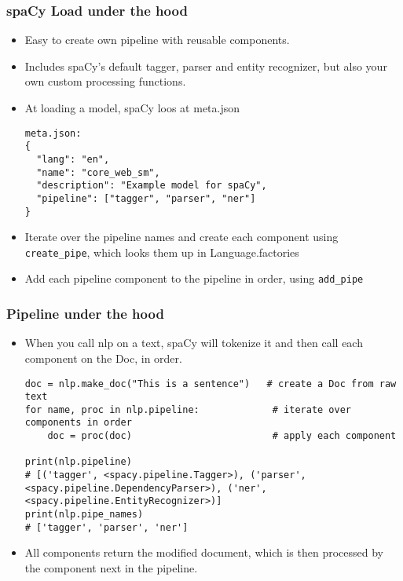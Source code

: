 \begin{frame}[fragile]\frametitle{spaCy Load under the hood}
  \begin{itemize}
    \item Easy to create own pipeline with reusable components.
		\item Includes spaCy's default tagger, parser and entity recognizer, but also your own custom processing functions.
		\item At loading a model, spaCy loos at meta.json
		\begin{lstlisting}
meta.json:
{
  "lang": "en",
  "name": "core_web_sm",
  "description": "Example model for spaCy",
  "pipeline": ["tagger", "parser", "ner"]
}
\end{lstlisting}

\item Iterate over the pipeline names and create each component using \lstinline|create_pipe|, which looks them up in Language.factories
\item Add each pipeline component to the pipeline in order, using \lstinline|add_pipe|

  \end{itemize}
	
	
\end{frame}

\begin{frame}[fragile]\frametitle{Pipeline under the hood}
  \begin{itemize}
    \item When you call nlp on a text, spaCy will tokenize it and then call each component on the Doc, in order.
		\begin{lstlisting}
doc = nlp.make_doc("This is a sentence")   # create a Doc from raw text
for name, proc in nlp.pipeline:             # iterate over components in order
    doc = proc(doc)                         # apply each component

print(nlp.pipeline)
# [('tagger', <spacy.pipeline.Tagger>), ('parser', <spacy.pipeline.DependencyParser>), ('ner', <spacy.pipeline.EntityRecognizer>)]
print(nlp.pipe_names)
# ['tagger', 'parser', 'ner']
\end{lstlisting}

\item All components return the modified document, which is then processed by the component next in the pipeline.

  \end{itemize}
	
	
\end{frame}

